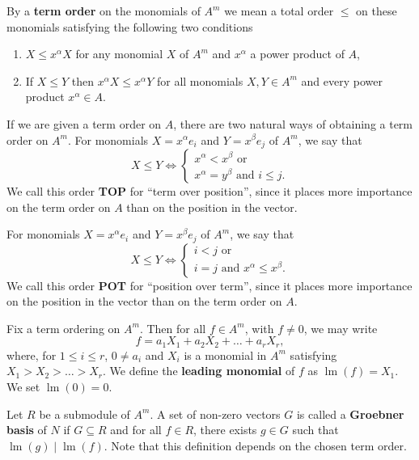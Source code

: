 \documentclass[12pt,a4paper]{article}
\DeclareMathOperator{\lm}{lm}
\begin{document}
By a \textbf{term order} on the monomials of $A^m$ we mean a total order $\le$ on these monomials satisfying the following two conditions
\begin{enumerate}[label={(\alph*)}]
\item $X\le x^\alpha X$ for any monomial $X$ of $A^m$ and $x^\alpha$ a power product of $A$,
\item If $X\le Y$ then $x^\alpha X\le x^\alpha Y$ for all monomials $X,Y\in A^m$ and every power product $x^\alpha\in A$.
\end{enumerate}

If we are given a term order on $A$, there are two natural ways of obtaining a term order on $A^m$.
For monomials $X=x^\alpha e_i$ and $Y=x^\beta e_j$ of $A^m$, we say that
\begin{equation*}
  X\le Y \iff
  \begin{cases}
    x^\alpha<x^\beta \text{ or }\\
    x^\alpha=y^\beta\text{ and } i\le j.
  \end{cases}
\end{equation*}
We call this order \textbf{TOP} for ``term over position'', since it places more importance on the term order on $A$ than on the position in the vector.

For monomials $X=x^\alpha e_i$ and $Y=x^\beta e_j$ of $A^m$, we say that
\begin{equation*}
  X\le Y \iff
  \begin{cases}
    i<j \text{ or }\\
    i=j\text{ and } x^\alpha\le x^\beta.
  \end{cases}
\end{equation*}
We call this order \textbf{POT} for ``position over term'', since it places more importance on the position in the vector than on the term order on $A$.

Fix a term ordering on $A^m$.
Then for all $f\in A^m$, with $f\neq 0$, we may write
\begin{equation*}
  f=a_1X_1+a_2X_2+\dots+a_rX_r,
\end{equation*}
where, for $1\le i\le r$, $0\neq a_i$ and $X_i$ is a monomial in $A^m$ satisfying $X_1>X_2>\dots >X_r$.
We define the \textbf{leading monomial} of $f$ as $\lm(f)=X_1$.
We set $\lm(0)=0$.

Let $R$ be a submodule of $A^m$.
A set of non-zero vectors $G$ is called a \textbf{Groebner basis} of $N$ if $G\subseteq R$ and for all $f\in R$, there exists $g\in G$ such that $\lm(g)\mid\lm(f)$.
Note that this definition depends on the chosen term order.
\end{document}
